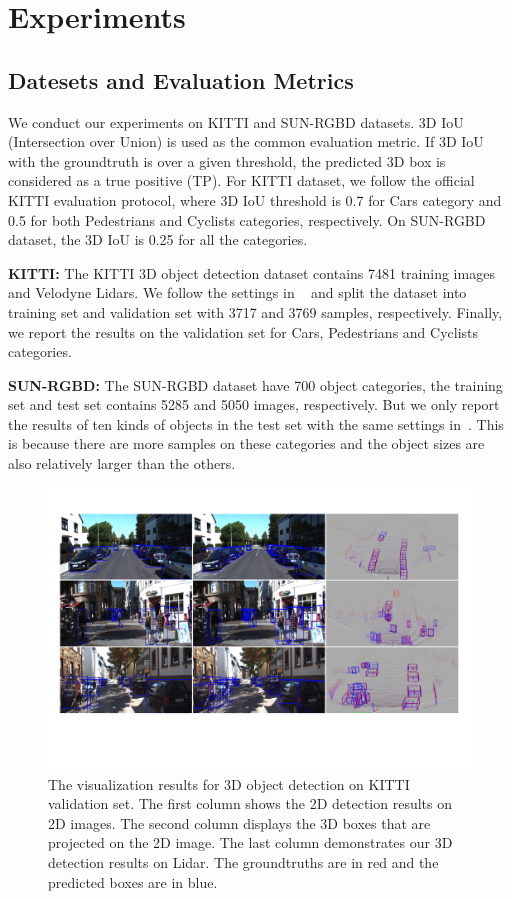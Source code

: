 \documentclass[letterpaper]{article} %
\begin{document}
\section{Experiments}
\subsection{Datesets and Evaluation Metrics}
We conduct our experiments on KITTI and SUN-RGBD datasets. 3D IoU (Intersection over Union) is used as the common evaluation metric. If 3D IoU with the groundtruth is over a given threshold, the predicted 3D box is considered as a true positive (TP). For KITTI dataset, we follow the official KITTI evaluation protocol, where 3D IoU threshold is 0.7 for Cars category and 0.5 for both Pedestrians and Cyclists categories, respectively. On SUN-RGBD dataset, the 3D IoU is 0.25 for all the categories.

{\bf KITTI:} The KITTI 3D object detection dataset contains 7481 training images and Velodyne Lidars. We follow the settings in ~\cite{qi2017frustum} and split the dataset into training set and validation set with 3717 and 3769 samples, respectively. Finally, we report the results on the validation set for Cars, Pedestrians and Cyclists categories.

{\bf SUN-RGBD:} The SUN-RGBD dataset have 700 object categories, the training set and test set contains 5285 and 5050 images, respectively. But we only report the results of ten kinds of objects in the test set with the same settings in~\cite{qi2017frustum}. This is because there are more samples on these categories and the object sizes are also relatively larger than the others.



\begin{figure}[t]
\begin{center}
  \includegraphics[width=0.87\linewidth]{KITTI_Results.pdf}
\end{center}
\caption{The visualization results for 3D object detection on KITTI validation set. The first column shows the 2D detection results on 2D images. The second column displays the 3D boxes that are projected on the 2D image. The last column demonstrates our 3D detection results on Lidar. The groundtruths are in red and the predicted boxes are in blue.}
\end{figure}
\end{document}
